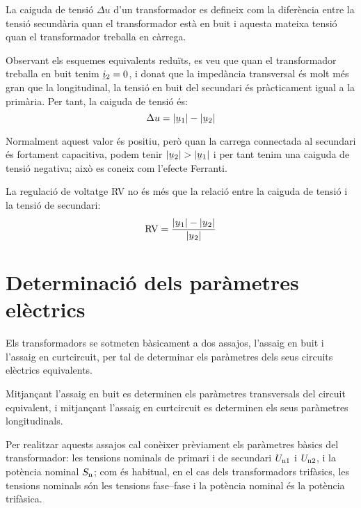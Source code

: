 La caiguda de tensió $\Delta u$ d'un transformador  es defineix com la diferència entre la tensió secundària quan el transformador està en buit i aquesta mateixa tensió quan el transformador treballa en càrrega.

Observant els esquemes equivalents reduïts, es veu que quan el transformador treballa en buit tenim $\cmplx{i}_2=0$, i donat que la impedància transversal és molt més gran que la longitudinal, la tensió en buit del secundari és pràcticament igual a la primària. Per tant, la caiguda de tensió és:
\begin{equation}
    \Delta u = |\cmplx{u}_1| - |\cmplx{u}_2|
\end{equation}

Normalment aquest valor és positiu, però quan la carrega connectada al secundari és fortament capacitiva, podem tenir  $|\cmplx{u}_2| > |\cmplx{u}_1|$ i per tant tenim una caiguda de tensió negativa; això es coneix com l'efecte Ferranti.

La regulació de voltatge RV no és més que la relació entre la caiguda de tensió i la tensió de secundari:
\begin{equation}
    \text{RV} = \frac{|\cmplx{u}_1| - |\cmplx{u}_2|}{|\cmplx{u}_2|}
\end{equation}

\section{Determinació dels paràmetres elèctrics}\label{sec:determ-param-trafo}

Els transformadors se sotmeten bàsicament a dos assajos, l'assaig en
buit i l'assaig en curtcircuit, per tal de determinar els paràmetres
dels seus circuits elèctrics equivalents.

Mitjançant l'assaig en buit es determinen els paràmetres
transversals del circuit equivalent, i mitjançant l'assaig en curtcircuit es determinen els seus paràmetres longitudinals.

Per  realitzar aquests assajos cal conèixer prèviament els paràmetres
bàsics del transformador: les tensions nominals de primari i de
secundari $U_\mathrm{n1}$ i $U_\mathrm{n2}$, i la potència nominal
$S_\mathrm{n}$; com és habitual, en el cas dels transformadors
trifàsics, les tensions nominals són les tensions fase--fase i la
potència nominal és la potència trifàsica.

